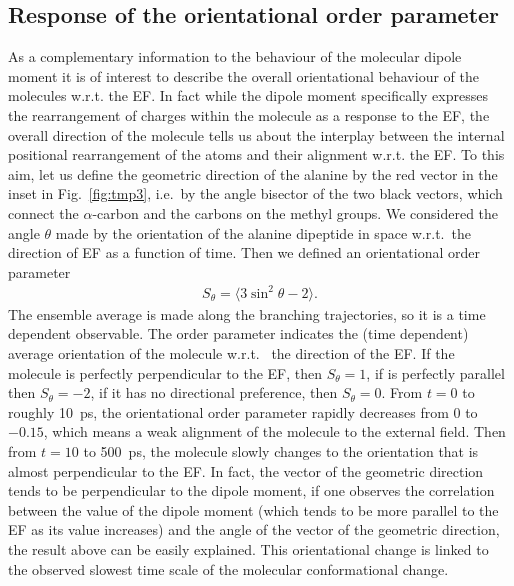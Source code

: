 \documentclass[journal=jctcce,manuscript=manuscript]{achemso}
\begin{document}
\subsection{Response of the orientational order parameter}
As a complementary information to the behaviour of the molecular dipole moment it is of interest to describe the overall orientational behaviour of the molecules w.r.t. the EF. In fact while the dipole moment specifically expresses the rearrangement of charges within the molecule as a response to the EF, the overall direction of the molecule tells us about the interplay between the internal positional rearrangement of the atoms and their alignment w.r.t. the EF.   
To this aim, let us define
the geometric direction of the alanine by the red vector in the inset in
Fig.~\ref{fig:tmp3}, i.e.~by the angle bisector of the two black vectors,
which connect the $\alpha$-carbon and the carbons
on the methyl groups. 
We considered the angle $\theta$ made by 
the orientation of the alanine dipeptide in space w.r.t.~the direction of EF
as a function of time.
Then we defined an orientational order parameter 
\begin{align}
  S_\theta = \langle 3\sin^2\theta - 2\rangle.
\end{align}
The ensemble average is made along the branching trajectories, so it is
a time dependent observable.
The order parameter
indicates the (time dependent) average orientation of the molecule w.r.t. ~the direction of the EF.
If the molecule is perfectly perpendicular to the EF, then $S_\theta = 1$, if is perfectly parallel then $S_\theta = -2$, if it has no directional
preference, then $S_\theta = 0$. 
From $t=0$ to roughly 10~ps, the orientational order parameter rapidly
decreases from 0 to $-0.15$, which means a weak alignment of the molecule to the external field.
Then from $t=10$ to 500~ps, the molecule slowly changes to the orientation
that is almost perpendicular to the EF.
In fact,
  the vector of the geometric direction tends to be perpendicular
    to the dipole moment,
  if one observes the correlation between the value
  of the dipole moment (which tends to be more parallel to the EF as
  its value increases) and the angle of the vector of the geometric
  direction, the result above can be easily explained.
This orientational change is linked to the observed slowest
time scale of the molecular conformational change.
 
\end{document}
